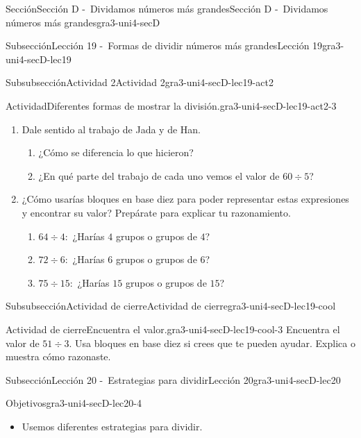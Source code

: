 \documentclass[twoside,10pt,]{article}
\begin{document}
\begin{sectionptx}{Sección}{Sección D -~Dividamos números más grandes}{}{Sección D -~Dividamos números más grandes}{}{}{gra3-uni4-secD}
\begin{subsectionptx}{Subsección}{Lección 19 -~Formas de dividir números más grandes}{}{Lección 19}{}{}{gra3-uni4-secD-lec19}
\begin{subsubsectionptx}{Subsubsección}{Actividad 2}{}{Actividad 2}{}{}{gra3-uni4-secD-lec19-act2}
\begin{activity}{Actividad}{Diferentes formas de mostrar la división.}{gra3-uni4-secD-lec19-act2-3}
\begin{enumerate}
\item{}Dale sentido al trabajo de Jada y de Han.%
%
\begin{enumerate}
\item{}¿Cómo se diferencia lo que hicieron?%
\item{}¿En qué parte del trabajo de cada uno vemos el valor de \(60 \div 5\)?%
\end{enumerate}
\item{}¿Cómo usarías bloques en base diez para poder representar estas expresiones y encontrar su valor? Prepárate para explicar tu razonamiento.%
%
\begin{enumerate}
\item{}\(64 \div 4:\) ¿Harías \(4\) grupos o grupos de \(4\)?%
\item{}\(72 \div 6:\) ¿Harías \(6\) grupos o grupos de \(6\)?%
\item{}\(75 \div 15:\) ¿Harías \(15\) grupos o grupos de \(15\)?%
\end{enumerate}
\end{enumerate}
\end{activity}%
\end{subsubsectionptx}
%
%
\typeout{************************************************}
\typeout{************************************************}
%
\begin{subsubsectionptx}{Subsubsección}{Actividad de cierre}{}{Actividad de cierre}{}{}{gra3-uni4-secD-lec19-cool}
\begin{project}{Actividad de cierre}{Encuentra el valor.}{gra3-uni4-secD-lec19-cool-3}%
Encuentra el valor de \(51 \div 3.\) Usa bloques en base diez si crees que te pueden ayudar. Explica o muestra cómo razonaste.%
\end{project}%
\end{subsubsectionptx}
\end{subsectionptx}
%
%
\typeout{************************************************}
\typeout{************************************************}
%
\begin{subsectionptx}{Subsección}{Lección 20 -~Estrategias para dividir}{}{Lección 20}{}{}{gra3-uni4-secD-lec20}
\begin{objectives}{Objetivos}{gra3-uni4-secD-lec20-4}
%
\begin{itemize}[label=\textbullet]
\item{}Usemos diferentes estrategias para dividir.%
\end{itemize}

\end{objectives}
\end{subsectionptx}
\end{sectionptx}
\end{document}
